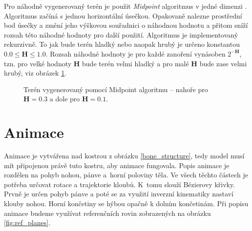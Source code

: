 Pro náhodně vygenerovaný terén je použit \textit{Midpoint} algoritmus v jedné dimenzi \cite{midPoint}. Algoritmus začíná s jednou horizontální úsečkou. Opakovaně nalezne prostřední bod úsečky a změní jeho výškovou souřadnici o náhodnou hodnotu a přitom sníží rozsah této náhodné hodnoty pro další použití. Algoritmus je implementovaný rekurzivně. To jak bude terén hladký nebo naopak hrubý je určeno konstantou $0.0 \leq \mathbf{H} \leq 1.0$. Rozsah náhodné hodnoty je pro každé zanoření vynásoben $2^{-\mathbf{H}}$, tzn. pro velké hodnoty $\mathbf{H}$ bude terén velmi hladký a pro malé $\mathbf{H}$ bude zase velmi hrubý, viz obrázek \ref{terrain}. 

\begin{figure}[h]
\begin{center}
\qquad
{}
\caption{Terén vygenerovaný pomocí Midpoint algoritmu -- nahoře pro $\mathbf{H} = 0.3$ a dole pro $\mathbf{H} = 0.1$.} \label{terrain}
\end{center}
\end{figure} 

\section{Animace}
Animace je vytvářena nad kostrou z obrázku \ref{bone_structure}, tedy model musí mít připojenou právě tuto kostru, aby animace fungovala. Popis animace je rozdělen na pohyb nohou, pánve a~horní poloviny těla. Ve všech těchto částech je potřeba určovat rotace a trajektorie kloubů. K~tomu slouží Bézierovy křivky. Prvně je určen pohyb pánve a poté se za využití inverzní kinematiky nastaví klouby nohou. Horní končetiny se hýbou opačně k dolním končetinám. Při popisu animace budeme využívat referenčních rovin zobrazených na obrázku \ref{fig:ref_planes}.


